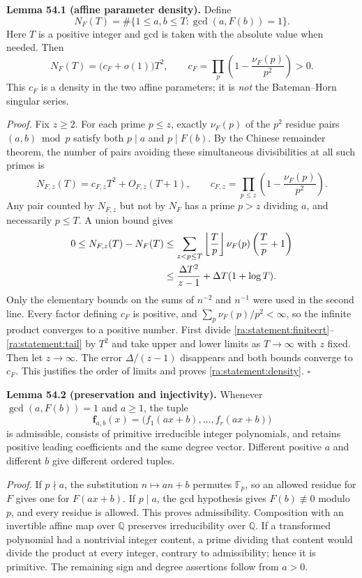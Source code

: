 \documentclass[11pt]{article}
\newcommand{\Q}{\mathbb{Q}}
\newcommand{\F}{\mathbb{F}}
\begin{document}
\textbf{Lemma 54.1 (affine parameter density).} Define
\[
 N_F(T)=\#\{1\le a,b\le T:\gcd(a,F(b))=1\}.
\]
Here $T$ is a positive integer and gcd is taken with the absolute value
when needed. Then
\begin{equation}\label{ra:statement:density}
 N_F(T)=\bigl(c_F+o(1)\bigr)T^2,
 \qquad
 c_F=\prod_p\left(1-\frac{\nu_F(p)}{p^2}\right)>0.
\end{equation}
This $c_F$ is a density in the two affine parameters; it is \emph{not}
the Bateman--Horn singular series.

\textit{Proof.} Fix $z\ge2$. For each prime $p\le z$, exactly
$\nu_F(p)$ of the $p^2$ residue pairs $(a,b)\bmod p$ satisfy both
$p\mid a$ and $p\mid F(b)$. By the Chinese remainder theorem, the number
of pairs avoiding these simultaneous divisibilities at all such primes is
\begin{equation}\label{ra:statement:finitecrt}
 N_{F,z}(T)=c_{F,z}T^2+O_{F,z}(T+1),\qquad
 c_{F,z}=\prod_{p\le z}\left(1-\frac{\nu_F(p)}{p^2}\right).
\end{equation}
Any pair counted by $N_{F,z}$ but not by $N_F$ has a prime $p>z$
dividing $a$, and necessarily $p\le T$. A union bound gives
\begin{align}
 0\le N_{F,z}(T)-N_F(T)
 &\le\sum_{z<p\le T}\left\lfloor\frac{T}{p}\right\rfloor
       \nu_F(p)\left(\frac{T}{p}+1\right)\notag\\
 &\le\frac{\Delta T^2}{z-1}
       +\Delta T(1+\log T).\label{ra:statement:tail}
\end{align}
Only the elementary bounds on the sums of $n^{-2}$ and $n^{-1}$ were
used in the second line. Every factor defining $c_F$ is positive, and
$\sum_p\nu_F(p)/p^2<\infty$, so the infinite product converges to a
positive number. First divide \eqref{ra:statement:finitecrt}--\eqref{ra:statement:tail}
by $T^2$ and take upper and lower limits as $T\to\infty$ with $z$ fixed.
Then let $z\to\infty$. The error $\Delta/(z-1)$ disappears and both
bounds converge to $c_F$. This justifies the order of limits and proves
\eqref{ra:statement:density}. \hfill$\square$

\textbf{Lemma 54.2 (preservation and injectivity).} Whenever
$\gcd(a,F(b))=1$ and $a\ge1$, the tuple
\[
 \mathbf f_{a,b}(x)=\bigl(f_1(ax+b),\ldots,f_r(ax+b)\bigr)
\]
is admissible, consists of primitive irreducible integer polynomials,
and retains positive leading coefficients and the same degree vector.
Different positive $a$ and different $b$ give different ordered tuples.

\textit{Proof.} If $p\nmid a$, the substitution $n\mapsto an+b$
permutes $\F_p$, so an allowed residue for $F$ gives one for
$F(ax+b)$. If $p\mid a$, the gcd hypothesis gives $F(b)\not\equiv0$
modulo $p$, and every residue is allowed. This proves admissibility.
Composition with an invertible affine map over $\Q$ preserves
irreducibility over $\Q$. If a transformed polynomial had a nontrivial
integer content, a prime dividing that content would divide the product
at every integer, contrary to admissibility; hence it is primitive.
The remaining sign and degree assertions follow from $a>0$.
\end{document}
